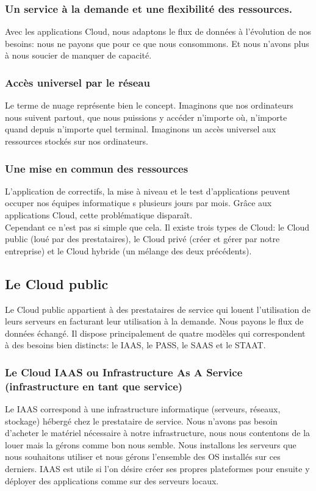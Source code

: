 \documentclass{report}
\begin{document}
    \subsubsection{Un service à la demande et une flexibilité des ressources.}
    Avec les applications Cloud, nous adaptons le flux de données à l'évolution de nos besoins: nous ne payons que pour ce que nous consommons. Et nous n'avons plus à nous soucier de manquer de capacité.

    \subsubsection{Accès universel par le réseau}
    Le terme de nuage représente bien le concept. Imaginons que nos ordinateurs nous suivent partout, que nous puissions y accéder n’importe où, n’importe quand depuis n’importe quel terminal. Imaginons un accès universel aux ressources stockés sur nos ordinateurs.

    \subsubsection{Une mise en commun des ressources}
    L'application de correctifs, la mise à niveau et le test d'applications peuvent occuper nos équipes informatique s plusieurs jours par mois. Grâce aux applications Cloud, cette problématique disparaît.\\

    Cependant ce n’est pas si simple que cela. Il existe trois types de Cloud: le Cloud public (loué par des prestataires), le Cloud privé (créer et gérer par notre entreprise) et le Cloud hybride (un mélange des deux précédents).

    \subsection{Le Cloud public}
    Le Cloud public appartient à des prestataires de service qui louent l’utilisation de leurs serveurs en facturant leur utilisation à la demande. Nous payons le flux de données échangé. Il dispose principalement de quatre modèles qui correspondent à des besoins bien distincts: le IAAS, le PASS, le SAAS et le STAAT.

      \subsubsection{Le Cloud IAAS ou Infrastructure As A Service (infrastructure en tant que service)}
      Le IAAS correspond à une infrastructure informatique (serveurs, réseaux, stockage) hébergé chez le prestataire de service. Nous n’avons pas besoin d’acheter le matériel nécessaire à notre infrastructure, nous nous contentons de la louer mais la gérons comme bon nous semble. Nous installons les serveurs que nous souhaitons utiliser et nous gérons l’ensemble des OS installés sur ces derniers. IAAS est utile si l’on désire créer ses propres plateformes pour ensuite y déployer des applications comme sur des serveurs locaux.
\end{document}
